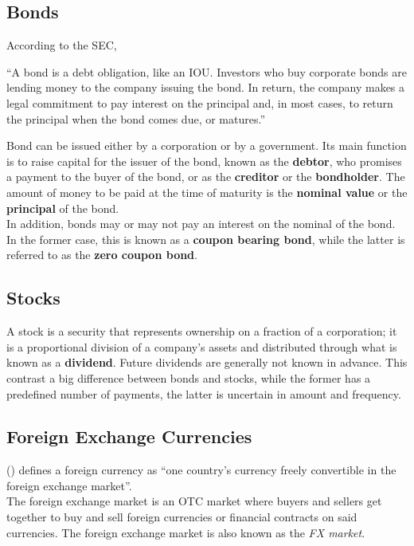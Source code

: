 \documentclass[11pt]{report}
\newcommand{\aycite}[1]{%
 \citeauthor{#1} (\citeyear{#1})}
\begin{document}
\subsection{Bonds}

According to the SEC,
\begin{displayquote}
``A bond is a debt obligation, like an IOU. Investors who buy corporate bonds are lending money to the company issuing the bond. In return, the company makes a legal commitment to pay interest on the principal and, in most cases, to return the principal when the bond comes due, or matures.''
\end{displayquote}

Bond can be issued either by a corporation or by a government. Its main function is to raise capital for the issuer of the bond, known as the \textbf{debtor}, who promises a payment to the buyer of the bond, or as the \textbf{creditor} or the \textbf{bondholder}. The amount of money to be paid at the time of maturity is the \textbf{nominal value} or the \textbf{principal} of the bond.\\

In addition, bonds may or may not pay an interest on the nominal of the bond. In the former case, this is known as a \textbf{coupon bearing bond}, while the latter is referred to as the \textbf{zero coupon bond}.

\subsection{Stocks}
A stock is a security that represents ownership on a fraction of a corporation; it is a proportional division of a company's assets and distributed through what is known as a \textbf{dividend}. Future dividends are generally not known in advance. This contrast a big difference between bonds and stocks, while the former has a predefined number of payments, the latter is uncertain in amount and frequency.

\subsection{Foreign Exchange Currencies}
\aycite{kozy} defines a foreign currency as ``one country's currency freely convertible in the foreign exchange market''.\\

The foreign exchange market is an OTC market where buyers and sellers get together to buy and sell foreign currencies or financial contracts on said currencies. The foreign exchange market is also known as the \textit{FX market}.
\end{document}
